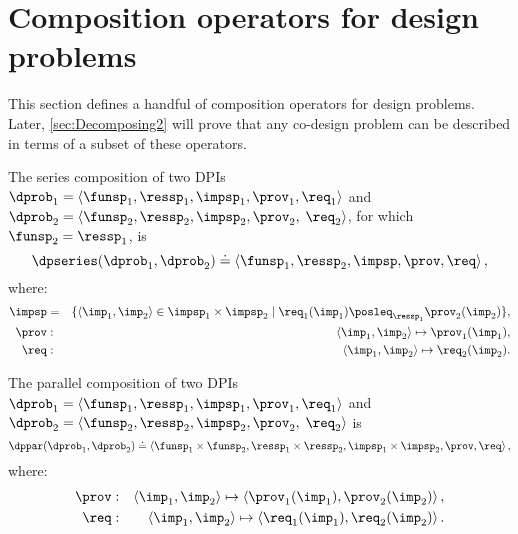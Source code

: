 \section{Composition operators for design problems}

This section defines a handful of composition operators for design
problems. Later, \cref{sec:Decomposing2} will prove that any co-design
problem can be described in terms of a subset of these operators.

\label{sec:threeoperators}
\begin{definition}[$\dpseries$]
    \label{def:series-composition}The series composition of two DPIs
    $\dprob_{1}=\langle\funsp_{1},\ressp_{1},\impsp_{1},\prov_{1},\req_{1}\rangle$
    and $\dprob_{2}=\langle\funsp_{2},\ressp_{2},\impsp_{2},\prov_{2},$
    $\req_{2}\rangle$, for which~$\funsp_{2}=\ressp_{1}$, is
    \[
        \dpseries(\dprob_{1},\dprob_{2})\doteq\left\langle \funsp_{1},\ressp_{2},\impsp,\prov,\req\right\rangle ,
    \]
    where:
    \begin{eqnarray*}
        \impsp & = & \{\left\langle \imp_{1},\imp_{2}\right\rangle \in\impsp_{1}\times\impsp_{2}\mid\req_{1}(\imp_{1})\posleq_{\ressp_{1}}\prov_{2}(\imp_{2})\},\\
        \prov & : & \left\langle \imp_{1},\imp_{2}\right\rangle \mapsto\prov_{1}(\imp_{1}),\\
        \req & : & \left\langle \imp_{1},\imp_{2}\right\rangle \mapsto\req_{2}(\imp_{2}).
    \end{eqnarray*}
\end{definition}
\begin{definition}[$\dppar$]
    \label{def:parallel}
    The parallel composition of two DPIs $\dprob_{1}=\left\langle \funsp_{1},\ressp_{1},\impsp_{1},\prov_{1},\req_{1}\right\rangle $
    and $\dprob_{2}=\langle\funsp_{2},\ressp_{2},\impsp_{2},\prov_{2},$
    $\req_{2}\rangle$ is
    \[
        \dppar(\dprob_{1},\dprob_{2})\doteq\left\langle \funsp_{1}\times\funsp_{2},\ressp_{1}\times\ressp_{2},\impsp_{1}\times\impsp_{2},\prov,\req\right\rangle ,
    \]
    where:
    \begin{eqnarray}
        \prov & : & \left\langle \imp_{1},\imp_{2}\right\rangle \mapsto\left\langle \prov_{1}(\imp_{1}),\prov_{2}(\imp_{2})\right\rangle ,\label{eq:dppar-exec}\\
        \req & : & \left\langle \imp_{1},\imp_{2}\right\rangle \mapsto\left\langle \req_{1}(\imp_{1}),\req_{2}(\imp_{2})\right\rangle .\nonumber
    \end{eqnarray}

\end{definition}


